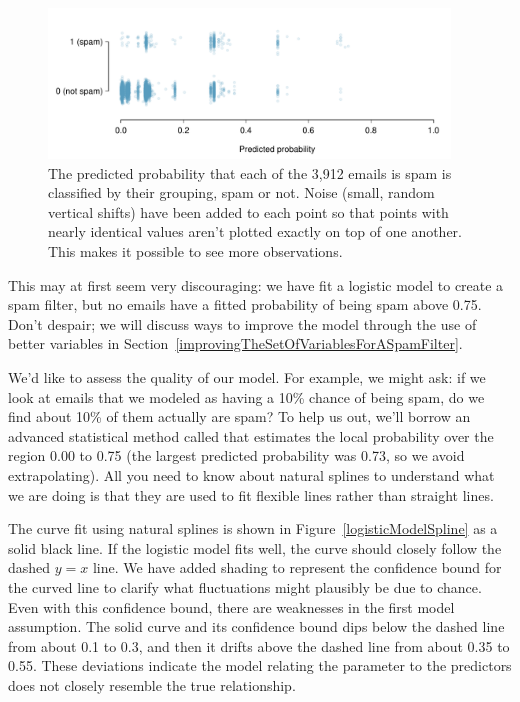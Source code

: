 \begin{figure}[h]
\centering
\includegraphics[width=0.95\textwidth]{ch_regr_mult_and_log/figures/logisticModel/logisticModelPredict}
\caption{The predicted probability that each of the 3,912 emails is spam is classified by their grouping, spam or not. Noise (small, random vertical shifts) have been added to each point so that points with nearly identical values aren't plotted exactly on top of one another. This makes it possible to see more observations.}
\label{logisticModelPredict}
\end{figure}

This may at first seem very discouraging: we have fit a logistic model to create a spam filter, but no emails have a fitted probability of being spam above 0.75. Don't despair; we will discuss ways to improve the model through the use of better variables in Section~\ref{improvingTheSetOfVariablesForASpamFilter}.

We'd like to assess the quality of our model. For example, we might ask: if we look at emails that we modeled as having a 10\% chance of being spam, do we find about 10\% of them actually are spam? To help us out, we'll borrow an advanced statistical method called  that estimates the local probability over the region 0.00 to 0.75 (the largest predicted probability was 0.73, so we avoid extrapolating). All you need to know about natural splines to understand what we are doing is that they are used to fit flexible lines rather than straight lines.

The curve fit using natural splines is shown in Figure~\ref{logisticModelSpline} as a solid black line. If the logistic model fits well, the curve should closely follow the dashed $y=x$ line. We have added shading to represent the confidence bound for the curved line to clarify what fluctuations might plausibly be due to chance. Even with this confidence bound, there are weaknesses in the first model assumption. The solid curve and its confidence bound dips below the dashed line from about 0.1 to 0.3, and then it drifts above the dashed line from about 0.35 to 0.55. These deviations indicate the model relating the parameter to the predictors does not closely resemble the true relationship.

